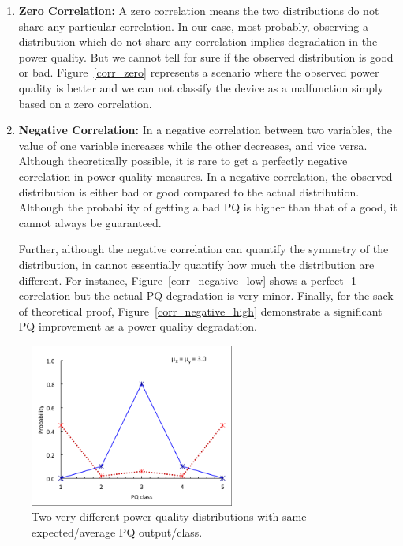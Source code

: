 \documentclass[12pt,oneside]{book}
\begin{document}
\begin{enumerate}
\item \textbf{Zero Correlation:} A zero correlation means the two distributions do not share any particular correlation. In our case, most probably, observing a distribution which do not share any correlation implies degradation in the power quality. But we cannot tell for sure if the observed distribution is good or bad. Figure~\ref{corr_zero} represents a scenario where the observed power quality is better and we can not classify the device as a malfunction simply based on a zero correlation.

\item \textbf{Negative Correlation:} In a negative correlation between two variables, the value of one variable increases while the other decreases, and vice versa. Although theoretically possible, it is rare to get a perfectly negative correlation in power quality measures. In a negative correlation, the observed distribution is either bad or good compared to the actual distribution. Although the probability of getting a bad PQ is higher than that of a good, it cannot always be guaranteed.

Further, although the negative correlation can quantify the symmetry of the distribution, in cannot essentially quantify how much the distribution are different. For instance, Figure~\ref{corr_negative_low} shows a perfect -1 correlation but the actual PQ degradation is very minor. Finally, for the sack of theoretical proof, Figure~\ref{corr_negative_high} demonstrate a significant PQ improvement as a power quality degradation.

\end{enumerate}

\begin{figure}[!t]
\centering
\includegraphics[width=0.6\textwidth]{average_pq_exception}
\caption{Two very different power quality distributions with same expected/average PQ output/class.}
\label{fig:average_pq_exception}
\end{figure}
\end{document}
